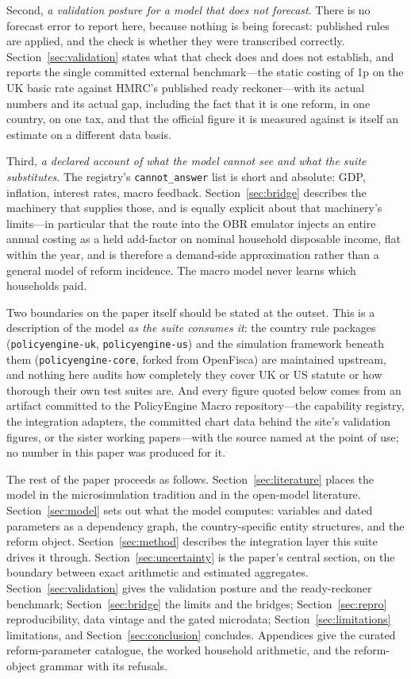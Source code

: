 Second, \emph{a validation posture for a model that does not forecast}. There is no forecast error to report here, because nothing is being forecast: published rules are applied, and the check is whether they were transcribed correctly. Section~\ref{sec:validation} states what that check does and does not establish, and reports the single committed external benchmark---the static costing of 1p on the UK basic rate against HMRC's published ready reckoner---with its actual numbers and its actual gap, including the fact that it is one reform, in one country, on one tax, and that the official figure it is measured against is itself an estimate on a different data basis.

Third, \emph{a declared account of what the model cannot see and what the suite substitutes}. The registry's \texttt{cannot\_answer} list is short and absolute: GDP, inflation, interest rates, macro feedback. Section~\ref{sec:bridge} describes the machinery that supplies those, and is equally explicit about that machinery's limits---in particular that the route into the OBR emulator injects an entire annual costing as a held add-factor on nominal household disposable income, flat within the year, and is therefore a demand-side approximation rather than a general model of reform incidence. The macro model never learns which households paid.

Two boundaries on the paper itself should be stated at the outset. This is a description of the model \emph{as the suite consumes it}: the country rule packages (\texttt{policyengine-uk}, \texttt{policyengine-us}) and the simulation framework beneath them (\texttt{policyengine-core}, forked from OpenFisca) are maintained upstream, and nothing here audits how completely they cover UK or US statute or how thorough their own test suites are. And every figure quoted below comes from an artifact committed to the PolicyEngine Macro repository---the capability registry, the integration adapters, the committed chart data behind the site's validation figures, or the sister working papers---with the source named at the point of use; no number in this paper was produced for it.

The rest of the paper proceeds as follows. Section~\ref{sec:literature} places the model in the microsimulation tradition and in the open-model literature. Section~\ref{sec:model} sets out what the model computes: variables and dated parameters as a dependency graph, the country-specific entity structures, and the reform object. Section~\ref{sec:method} describes the integration layer this suite drives it through. Section~\ref{sec:uncertainty} is the paper's central section, on the boundary between exact arithmetic and estimated aggregates. Section~\ref{sec:validation} gives the validation posture and the ready-reckoner benchmark; Section~\ref{sec:bridge} the limits and the bridges; Section~\ref{sec:repro} reproducibility, data vintage and the gated microdata; Section~\ref{sec:limitations} limitations, and Section~\ref{sec:conclusion} concludes. Appendices give the curated reform-parameter catalogue, the worked household arithmetic, and the reform-object grammar with its refusals.
